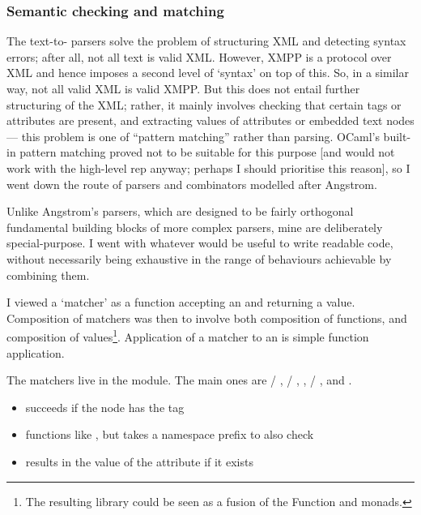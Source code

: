 \documentclass[12pt,a4paper,twoside,openright]{report}
\begin{document}
{\subsubsection{Semantic checking and matching} \label{sec:matchers}
The text-to- parsers solve the problem of structuring XML and detecting syntax errors; after all, not all text is valid XML. However, XMPP is a protocol over XML and hence imposes a second level of `syntax' on top of this. So, in a similar way, not all valid XML is valid XMPP. But this does not entail further structuring of the XML; rather, it mainly involves checking that certain tags or attributes are present, and extracting values of attributes or embedded text nodes --- this problem is one of ``pattern matching'' rather than parsing. OCaml's built-in pattern matching proved not to be suitable for this purpose [and would not work with the high-level rep anyway; perhaps I should prioritise this reason], so I went down the route of parsers and combinators modelled after Angstrom.

Unlike Angstrom's parsers, which are designed to be fairly orthogonal fundamental building blocks of more complex parsers, mine are deliberately special-purpose. I went with whatever would be useful to write readable code, without necessarily being exhaustive in the range of behaviours achievable by combining them.

I viewed a `matcher' as a function accepting an  and returning a  value. Composition of matchers was then to involve both composition of functions, and composition of  values\footnote{The resulting library could be seen as a fusion of the Function and  monads.}. Application of a matcher to an  is simple function application.

The matchers live in the  module. The main ones are  / ,  / , ,  / ,  and .

\begin{itemize}
  \item {} succeeds if the node has the  tag

  \item {} functions like , but takes a namespace prefix to also check

  \item {} results in the value of the  attribute if it exists


\end{itemize}}
\end{document}
